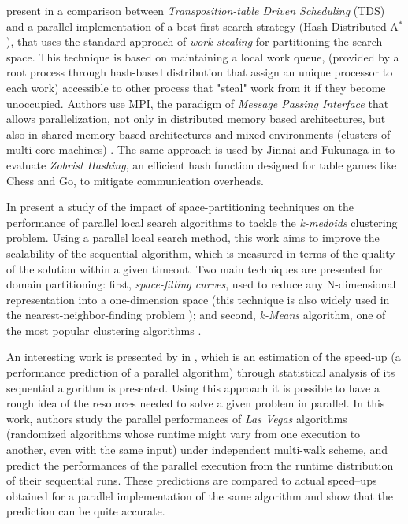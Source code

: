  present in \cite{Kishimoto2013} a comparison between \textit{Transposition-table Driven Scheduling} (TDS) and a parallel implementation of a best-first search strategy (Hash Distributed A$^*$), that uses the standard approach of \textit{work stealing} for partitioning the search space. This technique is based on maintaining a local work queue, (provided by a root process through hash-based distribution that assign an unique processor to each work) accessible to other process that "steal" work from it if they become unoccupied. Authors use MPI, the paradigm of \textit{Message Passing Interface} that allows parallelization, not only in distributed memory based architectures, but also in shared memory based architectures and mixed environments (clusters of multi-core machines) \cite{Grama2003a}. The same approach is used by Jinnai and Fukunaga in \cite{Jinnai} to evaluate \textit{Zobrist Hashing}, an efficient hash function designed for table games like Chess and Go, to mitigate communication overheads.

In \cite{Arbelaez2012}  present a study of the impact of space-partitioning techniques on the performance of parallel local search algorithms to tackle the \textit{k-medoids} clustering problem. Using a parallel local search method, this work aims to improve the scalability of the sequential algorithm, which is measured in terms of the quality of the solution within a given timeout. Two main techniques are presented for domain partitioning: first, {\it space-filling curves}, used to reduce any N-dimensional representation into a one-dimension space (this technique is also widely used in the nearest-neighbor-finding problem \cite{Chen2005}); and second, {\it k-Means} algorithm, one of the most popular clustering algorithms \cite{Berkhin2002}.

An interesting work is presented by  in \cite{Truchet02}, which is an estimation of the speed-up (a performance prediction of a parallel algorithm) through statistical analysis of its sequential algorithm is presented. Using this approach it is possible to have a rough idea of the resources needed to solve a given problem in parallel. In this work, authors study the parallel performances of \textit{Las Vegas} algorithms (randomized algorithms whose runtime might vary from one execution to another, even with the same input) under independent multi-walk scheme, and predict the performances of the parallel execution from the runtime distribution of their sequential runs. These predictions are compared to actual speed--ups obtained for a parallel implementation of the same algorithm and show that the prediction can be quite accurate.

